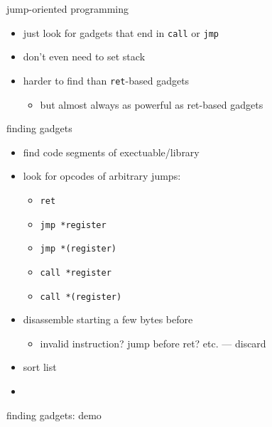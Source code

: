 \begin{frame}{jump-oriented programming}
    \begin{itemize}
        \item just look for gadgets that end in \texttt{call} or \texttt{jmp}
        \item don't even need to set stack
        \item harder to find than \texttt{ret}-based gadgets
            \begin{itemize}
            \item but almost always as powerful as ret-based gadgets
            \end{itemize}
    \end{itemize}
\end{frame}

\begin{frame}{finding gadgets}
    \begin{itemize}
        \item find code segments of exectuable/library
        \item look for opcodes of arbitrary jumps:
            \begin{itemize}
            \item \texttt{ret}
            \item \texttt{jmp *register}
            \item \texttt{jmp *(register)}
            \item \texttt{call *register}
            \item \texttt{call *(register)}
        \end{itemize}
        \item disassemble starting a few bytes before
            \begin{itemize}
            \item invalid instruction? jump before ret? etc. --- discard
            \end{itemize}
        \item sort list
        \vspace{.5cm}
    \item {}
    \end{itemize}
\end{frame}

\begin{frame}{finding gadgets: demo}
\end{frame}

